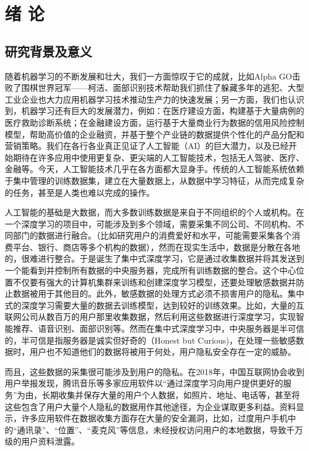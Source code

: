 \chapter{绪\hskip 0.4cm 论}
\label{ch1}

\section{研究背景及意义}
随着机器学习的不断发展和壮大，我们一方面惊叹于它的成就，比如Alpha GO击败了围棋世界冠军——柯洁、面部识别技术帮助我们抓住了躲藏多年的逃犯、大型工业企业也大力应用机器学习技术推动生产力的快速发展；另一方面，我们也认识到，机器学习还有巨大的发展潜力，例如：在医疗建设方面，构建基于大量病例的医疗救助诊断系统；在金融建设方面，运行基于大量商业行为数据的信用风险控制模型，帮助高价值的企业融资，并基于整个产业链的数据提供个性化的产品分配和营销策略。我们在各行各业真正见证了人工智能（AI）的巨大潜力，以及已经开始期待在许多应用中使用更复杂、更尖端的人工智能技术，包括无人驾驶、医疗、金融等。今天，人工智能技术几乎在各方面都大显身手。传统的人工智能系统依赖于集中管理的训练数据集，建立在大量数据上，从数据中学习特征，从而完成复杂的任务，甚至是人类也难以完成的操作。

人工智能的基础是大数据，而大多数训练数据是来自于不同组织的个人或机构。在一个深度学习的项目中，可能涉及到多个领域，需要采集不同公司、不同机构、不同部门的数据进行融合。（比如研究用户的消费爱好和水平，可能需要采集各个消费平台、银行、商店等多个机构的数据），然而在现实生活中，数据是分散在各地的，很难进行整合。于是诞生了集中式深度学习，它是通过收集数据并将其发送到一个能看到并控制所有数据的中央服务器，完成所有训练数据的整合。这个中心位置不仅要有强大的计算机集群来训练和创建深度学习模型，还要处理敏感数据并防止数据被用于其他目的。此外，敏感数据的处理方式必须不损害用户的隐私。集中式的深度学习需要大量的数据去训练模型，达到较好的训练效果。比如，大量的互联网公司从数百万的用户那里收集数据，然后利用这些数据进行深度学习，实现智能推荐、语音识别、面部识别等。然而在集中式深度学习中，中央服务器是半可信的，半可信是指服务器是诚实但好奇的（Honest but Curious)，在处理一些敏感数据时，用户也不知道他们的数据将被用于何处，用户隐私安全存在一定的威胁。

而且，这些数据的采集很可能涉及到用户的隐私。在2018年，中国互联网协会收到用户举报发现，腾讯音乐等多家应用软件以“通过深度学习向用户提供更好的服务”为由，长期收集并保存大量的用户个人数据，如照片、地址、电话等，甚至将这些包含了用户大量个人隐私的数据用作其他途径，为企业谋取更多利益。资料显示，许多应用软件在数据收集方面存在大量的安全漏洞，比如，过度用户手机中的“通讯录”、“位置”、“麦克风”等信息，未经授权访问用户的本地数据，导致千万级的用户资料泄露。

